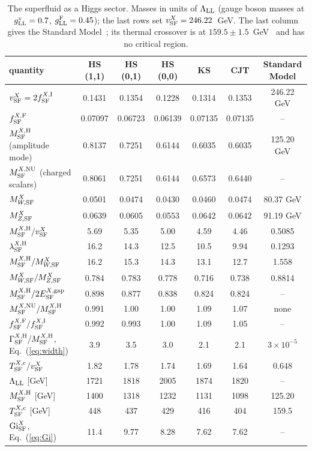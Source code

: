 \documentclass[aps,prd,twocolumn,superscriptaddress,nofootinbib,floatfix,longbibliography]{revtex4-2}
\newcommand{\LL}{{\rm LL}}
\newcommand{\SF}{{\rm SF}}
\begin{document}
\begin{table}
\caption{\label{tab:higgs}The superfluid as a Higgs sector. Masses in units of $\Lambda_\LL$ (gauge boson masses at
$g^{\rm v}_\LL=0.7$, $g^{\rm F}_\LL=0.45$); the last rows set $v^X_\SF=246.22$~GeV. The last column gives the Standard
Model~\cite{PDG2024}; its thermal crossover is at $159.5\pm1.5$~GeV~\cite{DOnofrio2016} and has no critical region.}
\begin{ruledtabular}
\begin{tabular}{lcccccc}
quantity & HS (1,1) & HS (0,1) & HS (0,0) & KS & CJT & Standard Model \\
\hline
$v^X_\SF=2f^{X,{\rm I}}_\SF$ & 0.1431 & 0.1354 & 0.1228 & 0.1314 & 0.1353 & 246.22 GeV \\
$f^{X,{\rm F}}_\SF$ & 0.07097 & 0.06723 & 0.06139 & 0.07135 & 0.07135 & -- \\
$M^{X,{\rm H}}_\SF$ (amplitude mode) & 0.8137 & 0.7251 & 0.6144 & 0.6035 & 0.6035 & 125.20 GeV \\
$M^{X,{\rm NU}}_\SF$ (charged scalars) & 0.8061 & 0.7251 & 0.6144 & 0.6573 & 0.6440 & -- \\
$M^X_{W,\SF}$ & 0.0501 & 0.0474 & 0.0430 & 0.0460 & 0.0474 & 80.37 GeV \\
$M^X_{Z,\SF}$ & 0.0639 & 0.0605 & 0.0553 & 0.0642 & 0.0642 & 91.19 GeV \\
$M^{X,{\rm H}}_\SF/v^X_\SF$ & 5.69 & 5.35 & 5.00 & 4.59 & 4.46 & 0.5085 \\
$\lambda^{X,{\rm H}}_\SF$ & 16.2 & 14.3 & 12.5 & 10.5 & 9.94 & 0.1293 \\
$M^{X,{\rm H}}_\SF/M^X_{W,\SF}$ & 16.2 & 15.3 & 14.3 & 13.1 & 12.7 & 1.558 \\
$M^X_{W,\SF}/M^X_{Z,\SF}$ & 0.784 & 0.783 & 0.778 & 0.716 & 0.738 & 0.8814 \\
$M^{X,{\rm H}}_\SF/2E^{X,{\rm gap}}_\SF$ & 0.898 & 0.877 & 0.838 & 0.824 & 0.824 & -- \\
$M^{X,{\rm NU}}_\SF/M^{X,{\rm H}}_\SF$ & 0.991 & 1.00 & 1.00 & 1.09 & 1.07 & none \\
$f^{X,{\rm F}}_\SF/f^{X,{\rm I}}_\SF$ & 0.992 & 0.993 & 1.00 & 1.09 & 1.05 & -- \\
$\Gamma^{X,{\rm H}}_\SF/M^{X,{\rm H}}_\SF$, Eq.~(\ref{eq:width}) & 3.9 & 3.5 & 3.0 & 2.1 & 2.1 & $3\times10^{-5}$ \\
$T^{X,{\rm c}}_\SF/v^X_\SF$ & 1.82 & 1.78 & 1.74 & 1.69 & 1.64 & 0.648 \\
$\Lambda_\LL$ [GeV] & 1721 & 1818 & 2005 & 1874 & 1820 & -- \\
$M^{X,{\rm H}}_\SF$ [GeV] & 1400 & 1318 & 1232 & 1131 & 1098 & 125.20 \\
$T^{X,{\rm c}}_\SF$ [GeV] & 448 & 437 & 429 & 416 & 404 & 159.5 \\
${\rm Gi}^X_\SF$, Eq.~(\ref{eq:Gi}) & 11.4 & 9.77 & 8.28 & 7.62 & 7.62 & -- \\
\end{tabular}
\end{ruledtabular}
\end{table}
\end{document}
